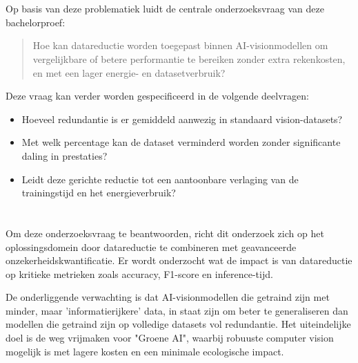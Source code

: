 \section{}%
\label{sec:onderzoeksvraag}

Op basis van deze problematiek luidt de centrale onderzoeksvraag van deze bachelorproef: 

\begin{quote}
Hoe kan datareductie worden toegepast binnen AI-visionmodellen om vergelijkbare of betere performantie te bereiken zonder extra rekenkosten, en met een lager energie- en datasetverbruik?
\end{quote}

Deze vraag kan verder worden gespecificeerd in de volgende deelvragen:
\begin{itemize}
    \item Hoeveel redundantie is er gemiddeld aanwezig in standaard vision-datasets?
    \item Met welk percentage kan de dataset verminderd worden zonder significante daling in prestaties?
    \item Leidt deze gerichte reductie tot een aantoonbare verlaging van de trainingstijd en het energieverbruik?
\end{itemize}

\section{}%
\label{sec:onderzoeksdoelstelling}

Om deze onderzoeksvraag te beantwoorden, richt dit onderzoek zich op het oplossingsdomein door datareductie te combineren met geavanceerde onzekerheidskwantificatie. Er wordt onderzocht wat de impact is van datareductie op kritieke metrieken zoals accuracy, F1-score en inference-tijd. 

De onderliggende verwachting is dat AI-visionmodellen die getraind zijn met minder, maar 'informatierijkere' data, in staat zijn om beter te generaliseren dan modellen die getraind zijn op volledige datasets vol redundantie. Het uiteindelijke doel is de weg vrijmaken voor "Groene AI", waarbij robuuste computer vision mogelijk is met lagere kosten en een minimale ecologische impact.

\section{}%
\label{sec:opzet-bachelorproef}

